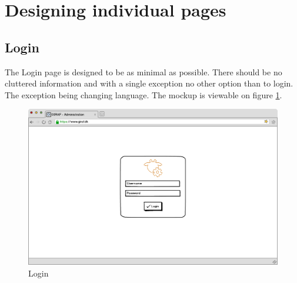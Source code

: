 \section{Designing individual pages}
\subsection{Login}
The Login page is designed to be as minimal as possible. There should be no cluttered information and with a single exception no other option than to login. The exception being changing language. The mockup is viewable on figure \ref{fig:loginDesign}.
\begin{figure}[p]
\centering
\includegraphics[width=1\textwidth]{images/mockup/login.png}
\caption{Login}
\label{fig:loginDesign}
\end{figure}

